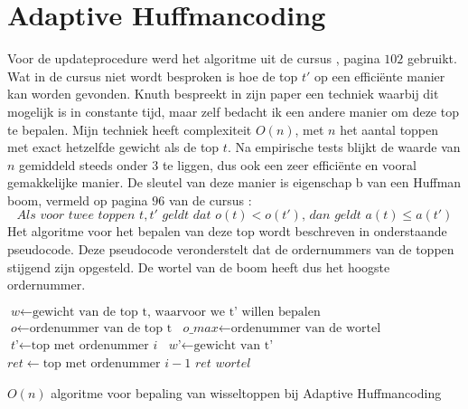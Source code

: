 \section{Adaptive Huffmancoding}
Voor de updateprocedure werd het algoritme uit de cursus \cite{ad3cursus}, pagina $102$ gebruikt. Wat in de cursus niet wordt besproken is hoe de top $t'$ op een effici\"ente manier kan worden gevonden. Knuth bespreekt in zijn paper \cite{knuthhuffman} een techniek waarbij dit mogelijk is in constante tijd, maar zelf bedacht ik een andere manier om deze top te bepalen. Mijn techniek heeft complexiteit $O(n)$, met $n$ het aantal toppen met exact hetzelfde gewicht als de top $t$. Na empirische tests blijkt de waarde van $n$ gemiddeld steeds onder $3$ te liggen, dus ook een zeer effici\"ente en vooral gemakkelijke manier. De sleutel van deze manier is eigenschap b van een Huffman boom, vermeld op pagina $96$ van de cursus \cite{ad3cursus}:
$$\textit{Als voor twee toppen }t, t'\textit{ geldt dat }o(t) < o(t')\textit{, dan geldt }a(t) \leq a(t')$$
Het algoritme voor het bepalen van deze top wordt beschreven in onderstaande pseudocode. Deze pseudocode veronderstelt dat de ordernummers van de toppen stijgend zijn opgesteld. De wortel van de boom heeft dus het hoogste ordernummer.
\begin{algorithm}
	\begin{algorithmic}[1]
		\State $\textit{w} \gets \text{gewicht van de top t, waarvoor we t' willen bepalen}$
		\State $\textit{o} \gets \text{ordenummer van de top t}$
		\State $\textit{o\_max} \gets \text{ordenummer van de wortel}$
			\State $\textit{t'} \gets \text{top met ordenummer }\textit{i}$
			\State $\textit{w'} \gets \text{gewicht van t'}$
				\State $\textit{ret} \gets \text{top met ordenummer } i-1$
				\Return $\textit{ret}$
			\EndIf
		\EndFor
		\Return $\textit{wortel}$
		\EndProcedure
	\end{algorithmic}
	\caption{$O(n)$ algoritme voor bepaling van wisseltoppen bij Adaptive Huffmancoding}
\end{algorithm}
